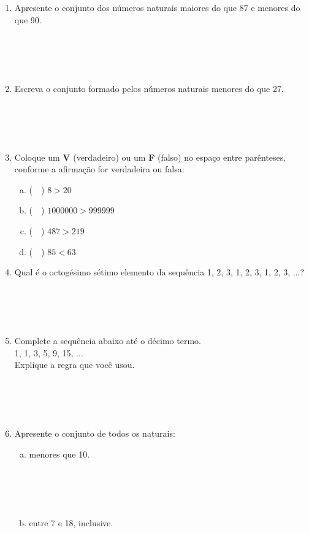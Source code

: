 \documentclass[a4paper,14pt]{article}
\begin{document}
\begin{multicols}{2}
\begin{enumerate}
			\item Apresente o conjunto dos números naturais maiores do que 87 e menores do que 90. \\\\\\\\\\
			\item Escreva o conjunto formado pelos números naturais menores do que 27. \\\\\\\\\\
			\item Coloque um \textbf{V} (verdadeiro) ou um \textbf{F} (falso) no espaço entre parênteses, conforme a afirmação for verdadeira ou falsa:
			\begin{enumerate}[a)]
				\item (~~) $8 > 20$
				\item (~~) $1 000 000 > 999 999$
				\item (~~) $487 > 219$
				\item (~~) $85 < 63$
			\end{enumerate}
			\item Qual é o octogésimo sétimo elemento da sequência 1, 2, 3, 1, 2, 3, 1, 2, 3, ...? \\\\\\\\\\
			\item Complete a sequência abaixo até o décimo termo. \\
			1, 1, 3, 5, 9, 15, ... \\
			Explique a regra que você usou. \\\\\\\\\\
			\item Apresente o conjunto de todos os naturais:
			\begin{enumerate}[a)]
				\item menores que 10. \\\\\\\\\\
				\item entre 7 e 18, inclusive. \\\\\\\\\\

\end{enumerate}
\end{enumerate}
\end{multicols}
\end{document}
